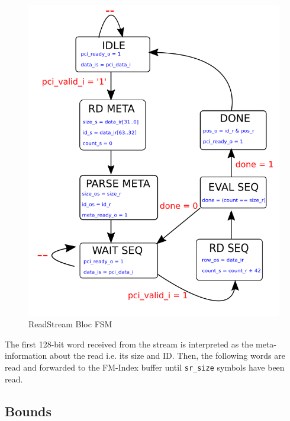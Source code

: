 \begin{minipage}[t]{0.45\textwidth}
\begin{figure}[H]
    \centering
    \hspace*{-20mm}\includegraphics[scale = 0.4]{Figures/RDPCI_FSM.png}
    \caption{ReadStream Bloc FSM}
    \label{fig:bounds_fsm}
\end{figure}
\end{minipage}
\hfill
\begin{minipage}[t]{0.4\textwidth}
The first 128-bit word received from the stream is interpreted as the meta-information about the read i.e. its size and ID. Then, the following words are read and forwarded to the FM-Index buffer until \texttt{sr\_size} symbols have been read.
\end{minipage}

\subsection{Bounds}


